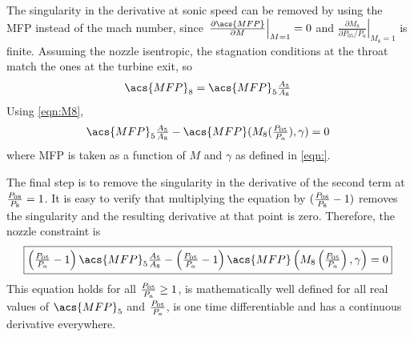 \documentclass[tcc]{subfiles}
\begin{document}
The singularity in the derivative at sonic speed can be removed by using the \ac{MFP} instead of the mach number, since 
$\left.\frac{\partial\acs{MFP}}{\partial M} \right|_{M=1} = 0$ 
and 
$\left.\frac{\partial M_8}{\partial P_{05}/P_a}\right|_{M_8=1}$ is finite.
 Assuming the nozzle isentropic, the stagnation conditions at the throat match the ones at the turbine exit, so
\begin{equation}
    \acs{MFP}_8 = \acs{MFP}_5 \tfrac{A_5}{A_8}
\end{equation}
Using \cref{eqn:M8},
\begin{equation}
    \textstyle
    \acs{MFP}_5 \tfrac{A_5}{A_8} - \acs{MFP}(M_8(\pr{05}{a}), \gamma) = 0
\end{equation}
where \acs{MFP} is taken as a function of $M$ and $\gamma$ as defined in \cref{eqn:}.

The final step is to remove the singularity in the derivative of the second term at $\frac{P_{08}}{P_{8}} = 1$. 
It is easy to verify that multiplying the equation by $(\frac{P_{08}}{P_{8}}-1)$ removes the singularity and the resulting derivative at that point is zero. 
Therefore, the nozzle constraint is
\begin{equation}
    \boxed{
    \textstyle
        \left(\pr{05}{a}-1\right)\acs{MFP}_5\frac{A_5}{A_8} - \left(\pr{05}{a}-1\right)\acs{MFP}\left(M_8\left(\pr{05}{a}\right), \gamma\right) = 0
    }
\end{equation}
This equation holds for all $\frac{P_{05}}{P_{a}} \geq 1$, is mathematically well defined for all real values of $\acs{MFP}_5$ and $\frac{P_{05}}{P_{a}}$, is one time differentiable and has a continuous derivative everywhere.
\end{document}
